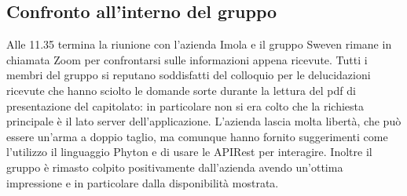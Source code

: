 \subsection{Confronto all'interno del gruppo}
Alle 11.35 termina la riunione con l'azienda Imola e il gruppo Sweven rimane in chiamata Zoom
per confrontarsi sulle informazioni appena ricevute. \newline
Tutti i membri del gruppo si reputano soddisfatti del colloquio per le delucidazioni ricevute 
che hanno sciolto le domande sorte durante la lettura del pdf di presentazione del capitolato:
in particolare non si era colto che la richiesta principale è il lato server dell'applicazione.
L'azienda lascia molta libertà, che può essere un'arma a doppio taglio, ma comunque hanno 
fornito suggerimenti come l'utilizzo il linguaggio Phyton e di usare le APIRest per interagire.
Inoltre il gruppo è rimasto colpito positivamente dall'azienda avendo un'ottima impressione e
in particolare dalla disponibilità mostrata.
